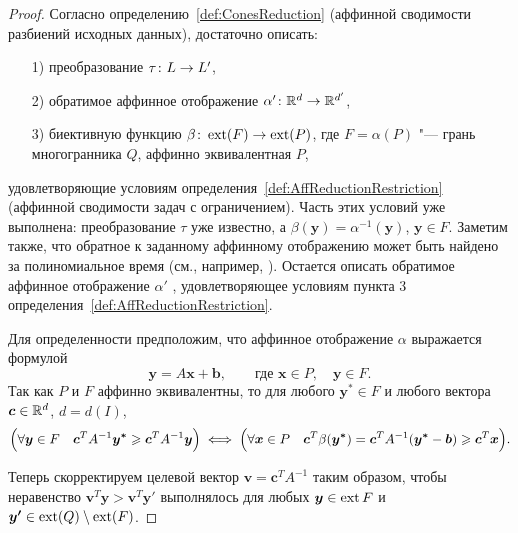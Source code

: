 \begin{proof}
Согласно определению~\ref{def:ConesReduction} (аффинной сводимости разбиений исходных данных), достаточно описать:
\begin{enumerate}
 \item[1)] преобразование $\tau\colon L \to L'$, 
 \item[2)] обратимое аффинное отображение $\alpha'\colon \mathbb{R}^d \to \mathbb{R}^{d'}$,
 \item[3)] биективную функцию $\beta\colon \operatorname{ext}(F) \to \operatorname{ext}(P)$, где $F = \alpha(P)$ "--- грань многогранника $Q$, аффинно эквивалентная $P$, 
\end{enumerate}
удовлетворяющие условиям определения~\ref{def:AffReductionRestriction} (аффинной сводимости задач с ограничением).
Часть этих условий уже выполнена:
преобразование $\tau$ уже известно, а $\beta(\bm{y}) = \alpha^{-1}(\bm{y})$, $\bm{y} \in F$.
Заметим также, что обратное к заданному аффинному отображению может быть найдено за полиномиальное время (см., например, \cite{Winkler:1996}).
Остается описать обратимое аффинное отображение $\alpha'$ , удовлетворяющее условиям пункта 3 определения~\ref{def:AffReductionRestriction}.
	
Для определенности предположим, что аффинное отображение $\alpha$ выражается формулой 
\begin{equation}
\label{eq:aff-transf}
\bm{y} = A\bm{x} + \bm{b}, \qquad \text{где } \bm{x} \in P, \quad \bm{y} \in F.
\end{equation}
Так как $P$ и $F$ аффинно эквивалентны, то
для любого $\bm{y^*} \in F$ и любого вектора $\bm{c}\in\mathbb{R}^d$, $d = d(I)$,
\[
\Bigl( 
\forall \bm{y}\in F \quad \bm{c}^T A^{-1} \bm{y^*} \geqslant \bm{c}^T A^{-1} \bm{y} 
\Bigr)
\iff
\Bigl( 
\forall \bm{x}\in P \quad \bm{c}^T \beta(\bm{y^*}) = \bm{c}^T A^{-1}(\bm{y^*} - \bm{b}) \geqslant \bm{c}^T \bm{x}
\Bigr).
\]

Теперь скорректируем целевой вектор $\bm{v} = \bm{c}^T A^{-1}$ таким образом, чтобы неравенство $\bm{v}^T \bm{y} > \bm{v}^T \bm{y'}$ выполнялось для 
любых $\bm{y} \in \operatorname{ext}{F}$ и $\bm{y'} \in \operatorname{ext}(Q) \setminus \operatorname{ext}(F)$.


\end{proof}
